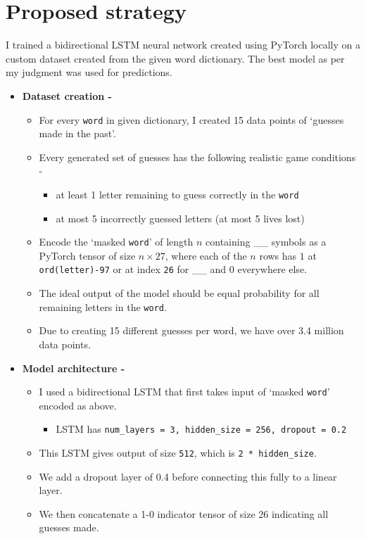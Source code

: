 \documentclass{article}
\begin{document}
\section{Proposed strategy}
I trained a bidirectional LSTM neural network created using PyTorch locally on a custom dataset created from the given word dictionary. The best model as per my judgment was used for predictions. 
\begin{itemize}
	\item \textbf{Dataset creation -} 
	\begin{itemize}
		\item For every \texttt{word} in given dictionary, I created 15 data points of `guesses made in the past'.
		\item Every generated set of guesses has the following realistic game conditions -
		\begin{itemize}
			\item at least 1 letter remaining to guess correctly in the \texttt{word}
			\item at most 5 incorrectly guessed letters (at most 5 lives lost)
		\end{itemize}
		\item Encode the `masked \texttt{word}' of length $n$ containing \_\_ symbols as a PyTorch tensor of size $n\times 27$, where each of the $n$ rows has $1$ at \texttt{ord(letter)-97} or at index \texttt{26} for \_\_ and $0$ everywhere else.
		\item The ideal output of the model should be equal probability for all remaining letters in the \texttt{word}. 
		\item Due to creating 15 different guesses per word, we have over 3.4 million data points. 
	\end{itemize}
	\item \textbf{Model architecture -}
	\begin{itemize}
		\item I used a bidirectional LSTM that first takes input of `masked \texttt{word}' encoded as above.
		\begin{itemize}
			\item LSTM has \texttt{num\_layers = 3, hidden\_size = 256, dropout = 0.2}
		\end{itemize}
		\item This LSTM gives output of size \texttt{512}, which is \texttt{2 * hidden\_size}.
		\item We add a dropout layer of 0.4 before connecting this fully to a linear layer. 
		\item We then concatenate a 1-0 indicator tensor of size 26 indicating all guesses made.

\end{itemize}
\end{itemize}
\end{document}
